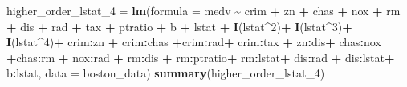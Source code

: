 \documentclass[
]{article}
\newenvironment{Shaded}{\begin{snugshade}}{\end{snugshade}}
\newcommand{\AttributeTok}[1]{\textcolor[rgb]{0.13,0.29,0.53}{#1}}
\newcommand{\DecValTok}[1]{\textcolor[rgb]{0.00,0.00,0.81}{#1}}
\newcommand{\FunctionTok}[1]{\textcolor[rgb]{0.13,0.29,0.53}{\textbf{#1}}}
\newcommand{\NormalTok}[1]{#1}
\newcommand{\OtherTok}[1]{\textcolor[rgb]{0.56,0.35,0.01}{#1}}
\newcommand{\SpecialCharTok}[1]{\textcolor[rgb]{0.81,0.36,0.00}{\textbf{#1}}}
\begin{document}
\begin{Shaded}
\begin{Highlighting}[]
\NormalTok{higher\_order\_lstat\_4 }\OtherTok{=} \FunctionTok{lm}\NormalTok{(}\AttributeTok{formula =}\NormalTok{ medv }\SpecialCharTok{\textasciitilde{}}\NormalTok{ crim }\SpecialCharTok{+}\NormalTok{ zn }\SpecialCharTok{+}\NormalTok{ chas }\SpecialCharTok{+}\NormalTok{ nox }\SpecialCharTok{+}\NormalTok{ rm }\SpecialCharTok{+}\NormalTok{ dis }\SpecialCharTok{+}\NormalTok{ rad }\SpecialCharTok{+}\NormalTok{ tax }\SpecialCharTok{+}\NormalTok{ ptratio }\SpecialCharTok{+}\NormalTok{ b }\SpecialCharTok{+}\NormalTok{ lstat }\SpecialCharTok{+} \FunctionTok{I}\NormalTok{(lstat}\SpecialCharTok{\^{}}\DecValTok{2}\NormalTok{)}\SpecialCharTok{+} \FunctionTok{I}\NormalTok{(lstat}\SpecialCharTok{\^{}}\DecValTok{3}\NormalTok{)}\SpecialCharTok{+} \FunctionTok{I}\NormalTok{(lstat}\SpecialCharTok{\^{}}\DecValTok{4}\NormalTok{)}\SpecialCharTok{+}\NormalTok{ crim}\SpecialCharTok{:}\NormalTok{zn }\SpecialCharTok{+}\NormalTok{ crim}\SpecialCharTok{:}\NormalTok{chas  }\SpecialCharTok{+}\NormalTok{crim}\SpecialCharTok{:}\NormalTok{rad}\SpecialCharTok{+}\NormalTok{ crim}\SpecialCharTok{:}\NormalTok{tax }\SpecialCharTok{+}\NormalTok{ zn}\SpecialCharTok{:}\NormalTok{dis}\SpecialCharTok{+}\NormalTok{ chas}\SpecialCharTok{:}\NormalTok{nox }\SpecialCharTok{+}\NormalTok{chas}\SpecialCharTok{:}\NormalTok{rm }\SpecialCharTok{+}\NormalTok{ nox}\SpecialCharTok{:}\NormalTok{rad }\SpecialCharTok{+}\NormalTok{ rm}\SpecialCharTok{:}\NormalTok{dis }\SpecialCharTok{+}\NormalTok{ rm}\SpecialCharTok{:}\NormalTok{ptratio}\SpecialCharTok{+}\NormalTok{ rm}\SpecialCharTok{:}\NormalTok{lstat}\SpecialCharTok{+}\NormalTok{ dis}\SpecialCharTok{:}\NormalTok{rad }\SpecialCharTok{+}\NormalTok{ dis}\SpecialCharTok{:}\NormalTok{lstat}\SpecialCharTok{+}\NormalTok{ b}\SpecialCharTok{:}\NormalTok{lstat, }\AttributeTok{data =}\NormalTok{ boston\_data)}
\FunctionTok{summary}\NormalTok{(higher\_order\_lstat\_4)}
\end{Highlighting}
\end{Shaded}
\end{document}
